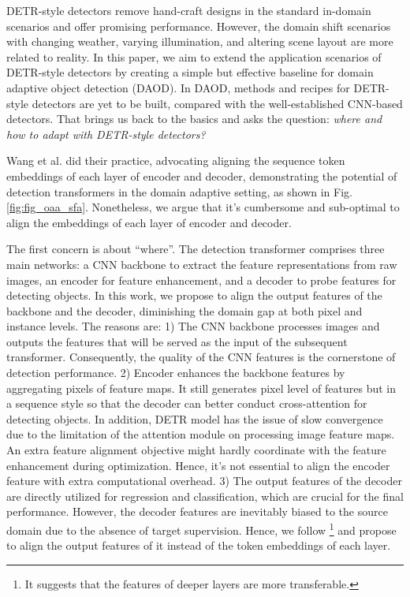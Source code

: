 \documentclass[sigconf]{acmart}
\begin{document}
DETR-style detectors \cite{detr,zhu2020deformable} remove hand-craft designs in the standard in-domain scenarios and offer promising performance. 
However, the domain shift scenarios with changing weather, varying illumination, and altering scene layout are more related to reality. In this paper, we aim to extend the application scenarios of DETR-style detectors by creating a simple but effective baseline for domain adaptive object detection (DAOD).
In DAOD, methods and recipes for DETR-style detectors are yet to be built, compared with the well-established  CNN-based detectors. That brings us back to the basics and asks the question: \textit{where and how to adapt with DETR-style detectors?}


Wang et al. \cite{wang2021exploring} did their practice, advocating aligning the sequence token embeddings of each layer of encoder and decoder, demonstrating the potential of detection transformers in the domain adaptive setting, as shown in Fig.\ref{fig:fig_oaa_sfa}. Nonetheless, we argue that it's cumbersome and sub-optimal to align the embeddings of each layer of encoder and decoder. 

The first concern is about ``where''. The detection transformer comprises three main networks: a CNN backbone to extract the feature representations from raw images, an encoder for feature enhancement, and a decoder to probe features for detecting objects. 
In this work, we propose to align the output features of the backbone and the decoder, diminishing the domain gap at both pixel and instance levels. The reasons are: 1) The CNN backbone processes images and outputs the features that will be served as the input of the subsequent transformer. Consequently, the quality of the CNN features is the cornerstone of detection performance. 2) Encoder enhances the backbone features by aggregating pixels of feature maps. It still generates pixel level of features but in a sequence style so that the decoder can better conduct cross-attention for detecting objects. In addition, DETR model has the issue of slow convergence due to the limitation of the attention module on processing image feature maps. An extra feature alignment objective might hardly coordinate with the feature enhancement during optimization. Hence, it's not essential to align the encoder feature with extra computational overhead. 3) The output features of the decoder are directly utilized for regression and classification, which are crucial for the final performance. However, the decoder features are inevitably biased to the source domain due to the absence of target supervision. Hence, we follow \cite{yosinski2014transferable}\footnote{It suggests that the features of deeper layers are more transferable.} and propose to align the output features of it instead of the token embeddings of each layer.
\end{document}
